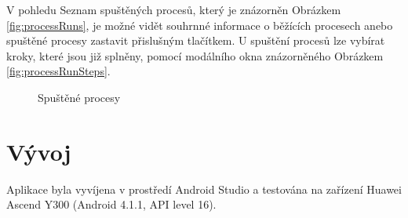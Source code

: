 \documentclass[12pt,a4paper]{article}
\let\oldsection\section
\renewcommand\section{\clearpage\oldsection}
\begin{document}
\newpage


V pohledu Seznam spuštěných procesů, který je znázorněn Obrázkem \ref{fig:processRuns}, je možné vidět souhrnné informace o běžících procesech anebo spuštěné procesy zastavit přislušným tlačítkem.
U spuštění procesů lze vybírat kroky, které jsou již splněny, pomocí modálního okna znázorněného Obrázkem \ref{fig:processRunSteps}.

\begin{figure}
	\centering
	\caption{Spuštěné procesy}
\end{figure}


\section{Vývoj}
Aplikace byla vyvíjena v prostředí Android Studio a testována na zařízení Huawei Ascend Y300 (Android 4.1.1, API level 16).
\end{document}
